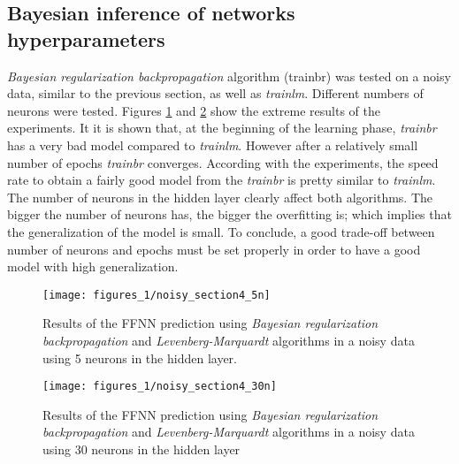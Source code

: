 \subsection{Bayesian inference of networks hyperparameters}
\textit{Bayesian regularization backpropagation} algorithm (trainbr) was tested on a noisy data, similar to the previous section, as well as \textit{trainlm}. Different numbers of neurons were tested. Figures \ref{noisy_section24} and \ref{noisy_section25} show the extreme results of the experiments.
\bigbreak
It it is shown that, at the beginning of the learning phase,  \textit{trainbr} has a very bad model compared to \textit{trainlm}. However after a relatively small number of epochs \textit{trainbr} converges. According with the experiments, the speed rate to obtain a fairly good model from the \textit{trainbr} is pretty similar to \textit{trainlm}. The number of neurons in the hidden layer clearly affect both algorithms. The bigger the number of neurons has, the bigger the overfitting is; which implies that the generalization of the model is small. To conclude, a good trade-off between number of neurons and epochs must be set properly in order to have a good model with high generalization.
\begin{figure}[!htbp]
\caption{Results of the FFNN prediction using \textit{Bayesian regularization backpropagation} and \textit{Levenberg-Marquardt} algorithms in a noisy data using 5 neurons in the hidden layer.}
\label{noisy_section24}
\texttt{[image: figures\_1/noisy\_section4\_5n]}
\centering
\end{figure}

\begin{figure}[!htbp]
\caption{Results of the FFNN prediction using \textit{Bayesian regularization backpropagation} and \textit{Levenberg-Marquardt} algorithms in a noisy data using 30 neurons in the hidden layer}
\label{noisy_section25}
\texttt{[image: figures\_1/noisy\_section4\_30n]}
\centering
\end{figure}